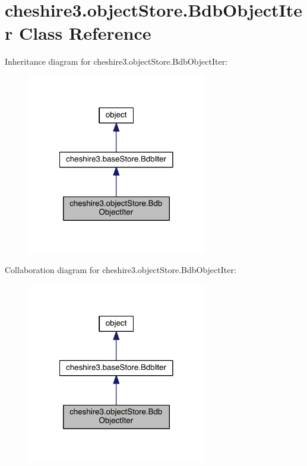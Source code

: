 \hypertarget{classcheshire3_1_1object_store_1_1_bdb_object_iter}{\section{cheshire3.\-object\-Store.\-Bdb\-Object\-Iter Class Reference}
\label{classcheshire3_1_1object_store_1_1_bdb_object_iter}
}


Inheritance diagram for cheshire3.\-object\-Store.\-Bdb\-Object\-Iter\-:
\nopagebreak
\begin{figure}[H]
\begin{center}
\leavevmode
\includegraphics[width=222pt]{classcheshire3_1_1object_store_1_1_bdb_object_iter__inherit__graph}
\end{center}
\end{figure}


Collaboration diagram for cheshire3.\-object\-Store.\-Bdb\-Object\-Iter\-:
\nopagebreak
\begin{figure}[H]
\begin{center}
\leavevmode
\includegraphics[width=222pt]{classcheshire3_1_1object_store_1_1_bdb_object_iter__coll__graph}
\end{center}
\end{figure}
